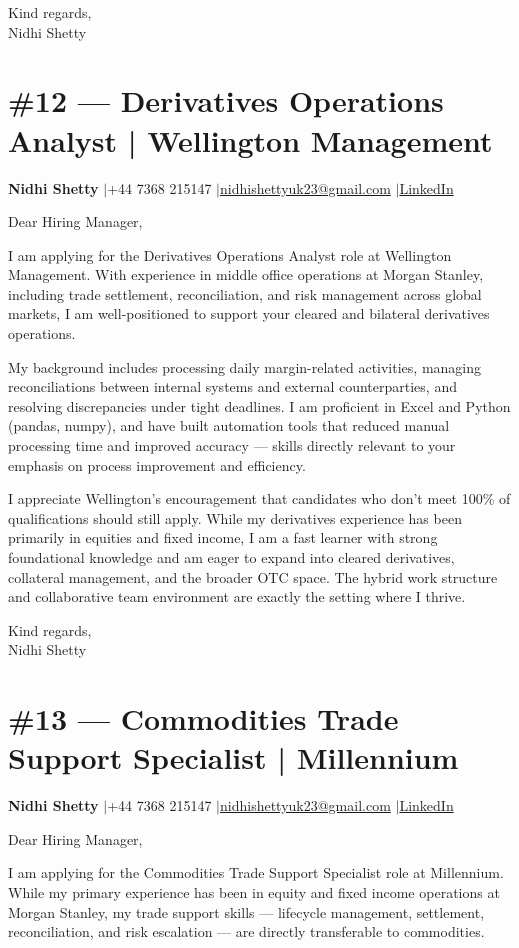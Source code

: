 \documentclass[11pt,a4paper]{article}
\makeatletter
\newcommand{\coverheader}{%
\begin{flushleft}
{\bfseries Nidhi Shetty} \enspace$\vert$\enspace +44 7368 215147 \enspace$\vert$\enspace \href{mailto:nidhishettyuk23@gmail.com}{nidhishettyuk23@gmail.com} \enspace$\vert$\enspace \href{https://www.linkedin.com/in/nidhi-shetty23-1841b7181}{LinkedIn}
\end{flushleft}
\vspace{4pt}
}
\makeatother
\begin{document}
\vspace{8pt}
Kind regards,\\
Nidhi Shetty

\newpage
\section{\#12 --- Derivatives Operations Analyst | Wellington Management}
\coverheader

Dear Hiring Manager,

I am applying for the Derivatives Operations Analyst role at Wellington Management. With experience in middle office operations at Morgan Stanley, including trade settlement, reconciliation, and risk management across global markets, I am well-positioned to support your cleared and bilateral derivatives operations.

My background includes processing daily margin-related activities, managing reconciliations between internal systems and external counterparties, and resolving discrepancies under tight deadlines. I am proficient in Excel and Python (pandas, numpy), and have built automation tools that reduced manual processing time and improved accuracy --- skills directly relevant to your emphasis on process improvement and efficiency.

I appreciate Wellington's encouragement that candidates who don't meet 100\% of qualifications should still apply. While my derivatives experience has been primarily in equities and fixed income, I am a fast learner with strong foundational knowledge and am eager to expand into cleared derivatives, collateral management, and the broader OTC space. The hybrid work structure and collaborative team environment are exactly the setting where I thrive.

\vspace{8pt}
Kind regards,\\
Nidhi Shetty

\newpage
\section{\#13 --- Commodities Trade Support Specialist | Millennium}
\coverheader

Dear Hiring Manager,

I am applying for the Commodities Trade Support Specialist role at Millennium. While my primary experience has been in equity and fixed income operations at Morgan Stanley, my trade support skills --- lifecycle management, settlement, reconciliation, and risk escalation --- are directly transferable to commodities.
\end{document}
